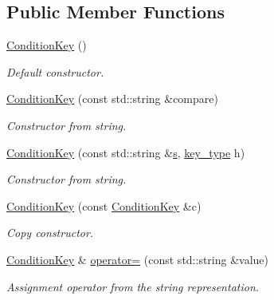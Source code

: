 \subsection*{Public Member Functions}
\begin{DoxyCompactItemize}
\item 
\hyperlink{class_d_d4hep_1_1_conditions_1_1_condition_key_a032d6c5ca16bc201fb7166d686a6207a}{ConditionKey} ()
\begin{DoxyCompactList}\small\item\em Default constructor. \item\end{DoxyCompactList}\item 
\hyperlink{class_d_d4hep_1_1_conditions_1_1_condition_key_a728bf6933d7d2d6069bd93d26f17432c}{ConditionKey} (const std::string \&compare)
\begin{DoxyCompactList}\small\item\em Constructor from string. \item\end{DoxyCompactList}\item 
\hyperlink{class_d_d4hep_1_1_conditions_1_1_condition_key_a18c78ead871dbf313c582dad6e2ae336}{ConditionKey} (const std::string \&\hyperlink{_volumes_8cpp_a17ca6bfc8040d695d3cada22a4763d40}{s}, \hyperlink{class_d_d4hep_1_1_conditions_1_1_condition_key_a08bfc8ccb807bdd5e4d9f3b065d1c8f5}{key\_\-type} h)
\begin{DoxyCompactList}\small\item\em Constructor from string. \item\end{DoxyCompactList}\item 
\hyperlink{class_d_d4hep_1_1_conditions_1_1_condition_key_a66405dd06d894a5f871f8ad8640f1db5}{ConditionKey} (const \hyperlink{class_d_d4hep_1_1_conditions_1_1_condition_key}{ConditionKey} \&c)
\begin{DoxyCompactList}\small\item\em Copy constructor. \item\end{DoxyCompactList}\item 
\hyperlink{class_d_d4hep_1_1_conditions_1_1_condition_key}{ConditionKey} \& \hyperlink{class_d_d4hep_1_1_conditions_1_1_condition_key_aa4ea8f008a5fe3ab0792c7dfeb826283}{operator=} (const std::string \&value)
\begin{DoxyCompactList}\small\item\em Assignment operator from the string representation. \item\end{DoxyCompactList}\item 

\end{DoxyCompactItemize}
